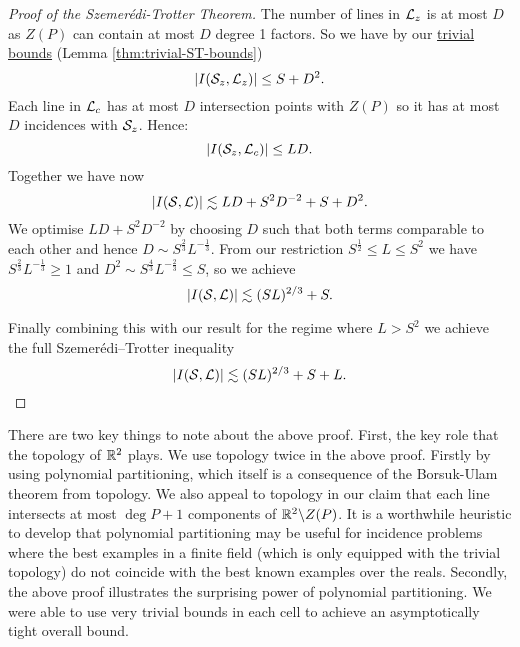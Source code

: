 \begin{proof}[Proof of the Szemerédi-Trotter Theorem]
The number of lines in $\mathcal L_z$ is at most $D$ as $Z(P)$ can contain at most $D$ degree 1 factors. So we have by our \hyperref[thm:trivial-ST-bounds]{trivial bounds} (Lemma \ref{thm:trivial-ST-bounds})
$$|I(\mathcal S_z, \mathcal L_z)| \leq S + D^2.$$
Each line in $\mathcal L_c$ has at most $D$ intersection points with $Z(P)$ so it has at most $D$ incidences with $\mathcal S_z$. Hence:
 $$|I(\mathcal S_z, \mathcal L_c)| \leq LD.$$
Together we have now 
$$|I(\mathcal S, \mathcal L)| \lesssim LD + S^2D^{-2} +S + D^2.$$
We optimise $LD + S^2D^{-2}$ by choosing $D$ such that both terms comparable to each other and hence $D \sim S^{\frac{2}{3}} L^{-\frac{1}{3}}$. 
From our restriction $S^{\frac{1}{2}} \leq L \leq S^2$ we have $S^{\frac{2}{3}} L^{-\frac{1}{3}} \geq 1$
and $D^2 \sim S^{\frac{4}{3}} L^{-\frac{2}{3}} \leq S$, so we achieve
$$|I(\mathcal S, \mathcal L)| \lesssim (SL)^{2/3} + S. $$

Finally combining this with our result for the regime where $L>S^2$ we achieve the full Szemerédi–Trotter inequality 
\[
|I(\mathcal S,\mathcal L)| \lesssim (SL)^{2/3} + S + L.
\]
\end{proof}

There are two key things to note about the above proof. First, the key role that the topology of $\mathbb R^2$ plays. We use topology twice in the above proof. Firstly by using polynomial partitioning, which itself is a consequence of the Borsuk-Ulam theorem from topology. We also appeal to topology in our claim that each line intersects at most $\deg P +1$ components of $\mathbb R^2 \backslash Z(P)$.  It is a worthwhile heuristic to develop that polynomial partitioning may be useful for incidence problems
where the best examples in a finite field (which is only equipped with the trivial topology) do not coincide with the best known examples over the reals.
Secondly, the above proof illustrates the surprising power of polynomial partitioning. We were able to use very trivial bounds in each cell to achieve
an asymptotically tight overall bound. 

